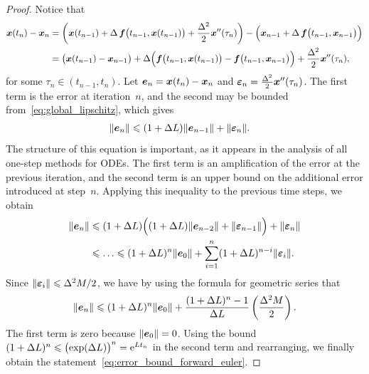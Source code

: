 \begin{proof}
    Notice that
    \begin{align*}
        \mathbf{\boldsymbol{x}}(t_{n}) - \mathbf{\boldsymbol{x}}_{n}
        &= \left( \mathbf{\boldsymbol{x}}(t_{n-1}) + \Delta \, \mathbf{\boldsymbol{f}}\bigl(t_{n-1}, \mathbf{\boldsymbol{x}}(t_{n-1})\bigr) + \frac{\Delta^2}{2} \mathbf{\boldsymbol{x}}''(\tau_n) \right)
        - \Bigl( \mathbf{\boldsymbol{x}}_{n-1} + \Delta \, \mathbf{\boldsymbol{f}}\bigl(t_{n-1}, \mathbf{\boldsymbol{x}}_{n-1}\bigr) \Bigr) \\
        &= \bigl(\mathbf{\boldsymbol{x}}(t_{n-1}) - \mathbf{\boldsymbol{x}}_{n-1}\bigr) + \Delta \Bigl( \mathbf{\boldsymbol{f}}\bigl(t_{n-1}, \mathbf{\boldsymbol{x}}(t_{n-1})\bigr) - \mathbf{\boldsymbol{f}}\bigl(t_{n-1}, \mathbf{\boldsymbol{x}}_{n-1}\bigr) \Bigr) + \frac{\Delta^2}{2} \mathbf{\boldsymbol{x}}''(\tau_n),
    \end{align*}
    for some $\tau_n \in (t_{n-1}, t_n)$.
    Let $\mathbf{\boldsymbol{e}}_n = \mathbf{\boldsymbol{x}}(t_n) - \mathbf{\boldsymbol{x}}_n$ and $\mathbf{\boldsymbol{\varepsilon}}_n = \frac{\Delta^2}{2} \mathbf{\boldsymbol{x}}''(\tau_n)$.
    The first term is the error at iteration~$n$,
    and the second may be bounded from~\eqref{eq:global_lipschitz},
    which gives
    \begin{align*}
        \lVert\mathbf{\boldsymbol{e}}_{n}\rVert
        &\leqslant (1 + \Delta L) \lVert\mathbf{\boldsymbol{e}}_{n-1}\rVert
        + \lVert\mathbf{\boldsymbol{\varepsilon}}_n\rVert.
    \end{align*}
    The structure of this equation is important,
    as it appears in the analysis of all one-step methods for ODEs.
    The first term is an amplification of the error at the previous iteration,
    and the second term is an upper bound on the additional error introduced at step~$n$.
    Applying this inequality to the previous time steps, we obtain
    \begin{align}
        \nonumber
        \lVert\mathbf{\boldsymbol{e}}_{n}\rVert
        &\leqslant (1 + \Delta L) \Bigl( (1 + \Delta L) \lVert\mathbf{\boldsymbol{e}}_{n-2}\rVert + \lVert\mathbf{\boldsymbol{\varepsilon}}_{n-1}\rVert \Bigr) + \lVert\mathbf{\boldsymbol{\varepsilon}}_{n}\rVert \\
        \label{eq:sum_local_and_accumulation}
        &\leqslant \dotsc
        \leqslant (1 + \Delta L)^{n} \lVert\mathbf{\boldsymbol{e}}_{0}\rVert + \sum_{i=1}^{n} (1 + \Delta L)^{n-i} \lVert\mathbf{\boldsymbol{\varepsilon}}_{i}\rVert.
    \end{align}
    Since $\lVert\mathbf{\boldsymbol{\varepsilon}}_i\rVert \leqslant \Delta^2M/2$,
    we have by using the formula for geometric series that
    \[
        \lVert\mathbf{\boldsymbol{e}}_{n}\rVert
        \leqslant (1 + \Delta L)^{n} \lVert\mathbf{\boldsymbol{e}}_{0}\rVert + \frac{(1+\Delta L)^{n} - 1}{\Delta L} \left( \frac{\Delta^2 M}{2} \right).
    \]
    The first term is zero because $\lVert\mathbf{\boldsymbol{e}}_{0}\rVert = 0$.
    Using the bound $(1+\Delta L)^n \leqslant \bigl(\exp(\Delta L)\bigr)^n = \mathrm e^{L t_n}$ in the second term and rearranging,
    we finally obtain the statement~\eqref{eq:error_bound_forward_euler}.
\end{proof}

